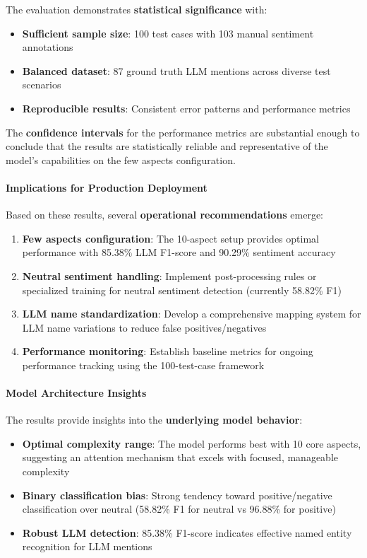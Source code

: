The evaluation demonstrates \textbf{statistical significance} with:
\begin{itemize}
    \item \textbf{Sufficient sample size}: 100 test cases with 103 manual sentiment annotations
    \item \textbf{Balanced dataset}: 87 ground truth LLM mentions across diverse test scenarios
    \item \textbf{Reproducible results}: Consistent error patterns and performance metrics
\end{itemize}

The \textbf{confidence intervals} for the performance metrics are substantial enough to conclude that the results are statistically reliable and representative of the model's capabilities on the few aspects configuration.

\paragraph{Implications for Production Deployment}

Based on these results, several \textbf{operational recommendations} emerge:

\begin{enumerate}
    \item \textbf{Few aspects configuration}: The 10-aspect setup provides optimal performance with 85.38\% LLM F1-score and 90.29\% sentiment accuracy
    \item \textbf{Neutral sentiment handling}: Implement post-processing rules or specialized training for neutral sentiment detection (currently 58.82\% F1)
    \item \textbf{LLM name standardization}: Develop a comprehensive mapping system for LLM name variations to reduce false positives/negatives
    \item \textbf{Performance monitoring}: Establish baseline metrics for ongoing performance tracking using the 100-test-case framework
\end{enumerate}

\paragraph{Model Architecture Insights}

The results provide insights into the \textbf{underlying model behavior}:
\begin{itemize}
    \item \textbf{Optimal complexity range}: The model performs best with 10 core aspects, suggesting an attention mechanism that excels with focused, manageable complexity
    \item \textbf{Binary classification bias}: Strong tendency toward positive/negative classification over neutral (58.82\% F1 for neutral vs 96.88\% for positive)
    \item \textbf{Robust LLM detection}: 85.38\% F1-score indicates effective named entity recognition for LLM mentions
\end{itemize}

